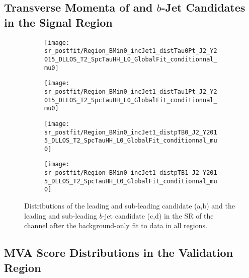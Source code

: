 \subsection*{Transverse Momenta of \tauhadvis and $b$-Jet Candidates in the
  Signal Region}

\begin{figure}[htbp]
  \centering

  \begin{subfigure}{0.495\textwidth}
    \centering

    \texttt{[image: sr\_postfit/Region\_BMin0\_incJet1\_distTau0Pt\_J2\_Y2015\_DLLOS\_T2\_SpcTauHH\_L0\_GlobalFit\_conditionnal\_mu0]}
    \subcaption{}
  \end{subfigure}\hfill%
  \begin{subfigure}{0.495\textwidth}
    \centering

    \texttt{[image: sr\_postfit/Region\_BMin0\_incJet1\_distTau1Pt\_J2\_Y2015\_DLLOS\_T2\_SpcTauHH\_L0\_GlobalFit\_conditionnal\_mu0]}
    \subcaption{}
  \end{subfigure}

  \begin{subfigure}{0.495\textwidth}
    \centering

    \texttt{[image: sr\_postfit/Region\_BMin0\_incJet1\_distpTB0\_J2\_Y2015\_DLLOS\_T2\_SpcTauHH\_L0\_GlobalFit\_conditionnal\_mu0]}
    \subcaption{}
  \end{subfigure}\hfill%
  \begin{subfigure}{0.495\textwidth}
    \centering

    \texttt{[image: sr\_postfit/Region\_BMin0\_incJet1\_distpTB1\_J2\_Y2015\_DLLOS\_T2\_SpcTauHH\_L0\_GlobalFit\_conditionnal\_mu0]}
    \subcaption{}
  \end{subfigure}

  \caption[Distributions of the leading and sub-leading \tauhadvis candidate \pT
  and the leading and sub-leading $b$-jet candidate \pT in the SR of the \hadhad
  channel.]{Distributions of the leading and sub-leading \tauhadvis candidate
    \pT (a,b) and the leading and sub-leading $b$-jet candidate \pT (c,d) in the
    SR of the \hadhad channel after the background-only fit to data in all
    regions.}
\end{figure}


\clearpage
\subsection*{MVA Score Distributions in the \ZJets Validation Region}

